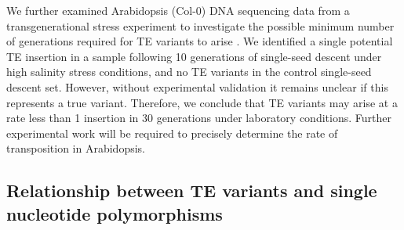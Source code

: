 \documentclass[12pt]{article}
\begin{document}
We further examined Arabidopsis (Col-0) DNA sequencing data from a
transgenerational stress experiment to investigate the possible minimum
number of generations required for TE variants to arise
\cite{Jiang:2014ih}. We identified a single potential TE insertion in a
sample following 10 generations of single-seed descent under high
salinity stress conditions, and no TE variants in the control
single-seed descent set. However, without experimental validation it
remains unclear if this represents a true variant. Therefore, we
conclude that TE variants may arise at a rate less than 1 insertion in
30 generations under laboratory conditions. Further experimental work
will be required to precisely determine the rate of transposition in
Arabidopsis.

\subsection{Relationship between TE variants and single nucleotide
polymorphisms}
\end{document}
